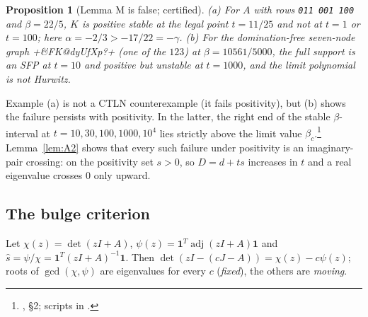 \documentclass[11pt]{article}
\newtheorem{proposition}[theorem]{Proposition}
\theoremstyle{definition}
\newcommand{\one}{\mathbf{1}}
\newcommand{\adj}{\operatorname{adj}}
\begin{document}
\begin{proposition}[Lemma M is false; certified]\label{prop:Mfalse}
(a) For $A$ with rows \texttt{011 001 100} and $\beta=22/5$, $K$ is positive stable at the legal point $t=11/25$ and not at
$t=1$ or $t=100$; here $\alpha=-2/3>-17/22=-\gamma$.
(b) For the domination-free seven-node graph \dsix+&FK@dyUfXp?+ (one of the $123$) at $\beta=10561/5000$, the full support is
an SFP at $t=10$ and positive but unstable at $t=1000$, and the limit polynomial is not Hurwitz.
\end{proposition}
Example (a) is not a CTLN counterexample (it fails positivity), but (b) shows the failure persists with positivity. In the
latter, the right end of the stable $\beta$-interval at $t=10,30,100,1000,10^4$ lies strictly above the limit value
$\beta_c$.\footnote{, \S2; scripts in .}
Lemma~\ref{lem:A2} shows that every such failure under positivity is an imaginary-pair crossing: on the positivity set
$s>0$, so $D=d+ts$ increases in $t$ and a real eigenvalue crosses $0$ only upward.

\subsection{The bulge criterion}
Let $\chi(z)=\det(zI+A)$, $\psi(z)=\one^T\adj(zI+A)\one$ and $\hat s=\psi/\chi=\one^T(zI+A)^{-1}\one$. Then
$\det(zI-(cJ-A))=\chi(z)-c\psi(z)$; roots of $\gcd(\chi,\psi)$ are eigenvalues for every $c$ (\emph{fixed}), the others are
\emph{moving}.
\end{document}
